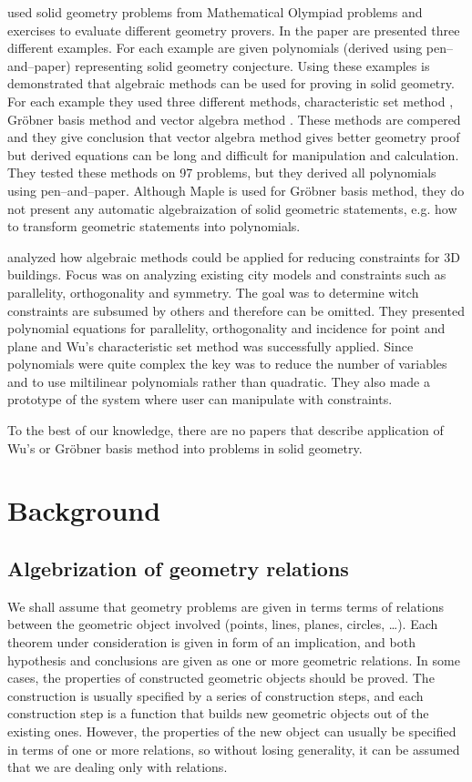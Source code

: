 \documentclass[final,1p,times,authoryear]{elsarticle}
\begin{document}
\cite{shao2016challenging} used solid geometry problems from
Mathematical Olympiad problems and exercises to evaluate different
geometry provers.  In the paper are presented three different
examples. For each example are given polynomials (derived using
pen--and--paper) representing solid geometry conjecture. Using these
examples is demonstrated that algebraic methods can be used for
proving in solid geometry. For each example they used three different
methods, characteristic set method \cite{wu}, Gr\"obner basis method
\cite{buchberger} and vector algebra method \cite{lord1985method}.
These methods are compered and they give conclusion that vector
algebra method gives better geometry proof but derived equations can
be long and difficult for manipulation and calculation. They tested
these methods on 97 problems, but they derived all polynomials using
pen--and--paper. Although Maple is used for Gr\"obner basis method,
they do not present any automatic algebraization of solid geometric
statements, e.g. how to transform geometric statements into
polynomials.

\cite{loch2009geometric} analyzed how algebraic methods could be
applied for reducing constraints for 3D buildings. Focus was on
analyzing existing city models and constraints such as parallelity,
orthogonality and symmetry.  The goal was to determine witch
constraints are subsumed by others and therefore can be omitted.  They
presented polynomial equations for parallelity, orthogonality and
incidence for point and plane and Wu's characteristic set method was
successfully applied. Since polynomials were quite complex the key was
to reduce the number of variables and to use miltilinear polynomials
rather than quadratic. They also made a prototype of the system where
user can manipulate with constraints.

To the best of our knowledge, there are no papers that describe
application of Wu's or Gr\"obner basis method into problems in solid
geometry.

\section{Background}
\subsection{Algebrization of geometry relations}
We shall assume that geometry problems are given in terms terms of
relations between the geometric object involved (points, lines,
planes, circles, \ldots). Each theorem under consideration is given in
form of an implication, and both hypothesis and conclusions are given
as one or more geometric relations. In some cases, the properties of
constructed geometric objects should be proved. The construction is
usually specified by a series of construction steps, and each
construction step is a function that builds new geometric objects out
of the existing ones. However, the properties of the new object can
usually be specified in terms of one or more relations, so without
losing generality, it can be assumed that we are dealing only with
relations.
\end{document}
